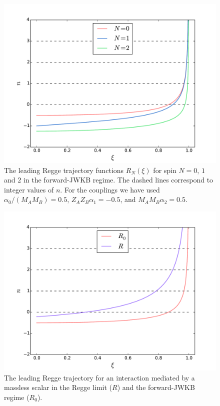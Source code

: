 \begin{figure}
\centering
\includegraphics[scale=0.56]{figures/012.pdf}
\caption{The leading Regge trajectory functions $R_{N}(\xi)$ for spin $N = 0$, $1$ and $2$ in the forward-JWKB regime. The dashed lines correspond to integer values of $n$. For the couplings we have used $\alpha_{0} / (M_{A} M_{B}) = 0.5$, $Z_{A} Z_{B} \alpha_{1} = -0.5$, and $M_{A} M_{B} \alpha_{2} = 0.5$.}
\label{fig012}
\end{figure}

\begin{figure}
\centering
\includegraphics[scale=0.56]{figures/R0R.pdf}
\caption{The leading Regge trajectory for an interaction mediated by a massless scalar in the Regge limit ($R$) and the forward-JWKB regime ($R_{0}$).}
\label{figR0R}
\end{figure}

